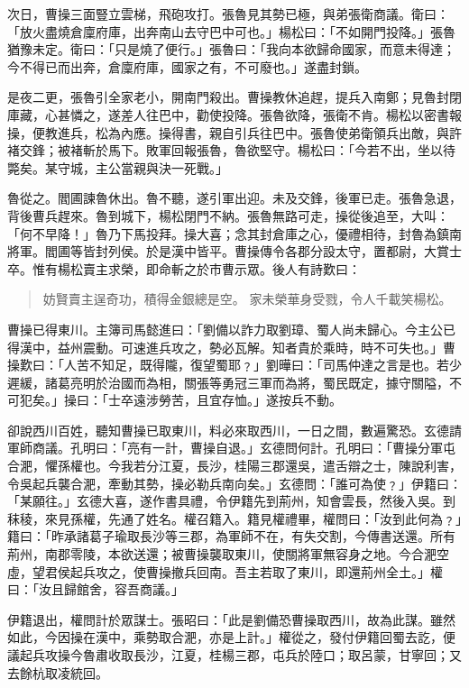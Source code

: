 次日，曹操三面豎立雲梯，飛砲攻打。張魯見其勢已極，與弟張衛商議。衛曰：「放火盡燒倉廩府庫，出奔南山去守巴中可也。」楊松曰：「不如開門投降。」張魯猶豫未定。衛曰：「只是燒了便行。」張魯曰：「我向本欲歸命國家，而意未得達；今不得已而出奔，倉廩府庫，國家之有，不可廢也。」遂盡封鎖。

是夜二更，張魯引全家老小，開南門殺出。曹操教休追趕，提兵入南鄭；見魯封閉庫藏，心甚憐之，遂差人往巴中，勸使投降。張魯欲降，張衛不肯。楊松以密書報操，便教進兵，松為內應。操得書，親自引兵往巴中。張魯使弟衛領兵出敵，與許褚交鋒；被褚斬於馬下。敗軍回報張魯，魯欲堅守。楊松曰：「今若不出，坐以待斃矣。某守城，主公當親與決一死戰。」

魯從之。閻圃諫魯休出。魯不聽，遂引軍出迎。未及交鋒，後軍已走。張魯急退，背後曹兵趕來。魯到城下，楊松閉門不納。張魯無路可走，操從後追至，大叫：「何不早降！」魯乃下馬投拜。操大喜；念其封倉庫之心，優禮相待，封魯為鎮南將軍。閻圃等皆封列侯。於是漢中皆平。曹操傳令各郡分設太守，置都尉，大賞士卒。惟有楊松賣主求榮，即命斬之於市曹示眾。後人有詩歎曰：

\begin{quote}
妨賢賣主逞奇功，積得金銀總是空。
家未榮華身受戮，令人千載笑楊松。
\end{quote}

曹操已得東川。主簿司馬懿進曰：「劉備以詐力取劉璋、蜀人尚未歸心。今主公已得漢中，益州震動。可速進兵攻之，勢必瓦解。知者貴於乘時，時不可失也。」曹操歎曰：「人苦不知足，既得隴，復望蜀耶﹖」劉曄曰：「司馬仲達之言是也。若少遲緩，諸葛亮明於治國而為相，關張等勇冠三軍而為將，蜀民既定，據守關隘，不可犯矣。」操曰：「士卒遠涉勞苦，且宜存恤。」遂按兵不動。

卻說西川百姓，聽知曹操已取東川，料必來取西川，一日之間，數遍驚恐。玄德請軍師商議。孔明曰：「亮有一計，曹操自退。」玄德問何計。孔明曰：「曹操分軍屯合淝，懼孫權也。今我若分江夏，長沙，桂陽三郡還吳，遣舌辯之士，陳說利害，令吳起兵襲合淝，牽動其勢，操必勒兵南向矣。」玄德問：「誰可為使﹖」伊籍曰：「某願往。」玄德大喜，遂作書具禮，令伊籍先到荊州，知會雲長，然後入吳。到秣稜，來見孫權，先通了姓名。權召籍入。籍見權禮畢，權問曰：「汝到此何為﹖」籍曰：「昨承諸葛子瑜取長沙等三郡，為軍師不在，有失交割，今傳書送還。所有荊州，南郡零陵，本欲送還；被曹操襲取東川，使關將軍無容身之地。今合淝空虛，望君侯起兵攻之，使曹操撤兵回南。吾主若取了東川，即還荊州全土。」權曰：「汝且歸館舍，容吾商議。」

伊籍退出，權問計於眾謀士。張昭曰：「此是劉備恐曹操取西川，故為此謀。雖然如此，今因操在漢中，乘勢取合淝，亦是上計。」權從之，發付伊籍回蜀去訖，便議起兵攻操今魯肅收取長沙，江夏，桂楊三郡，屯兵於陸口；取呂蒙，甘寧回；又去餘杭取凌統回。

